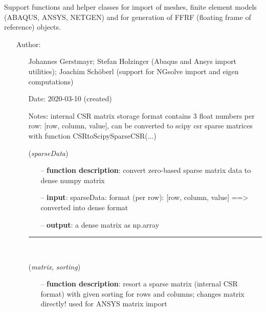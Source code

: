 \begin{itemize}[leftmargin=1.4cm]
\begin{itemize}[leftmargin=0.5cm]
\begin{itemize}[leftmargin=1.4cm]
%
\label{sec:module:FEM}
  Support functions and helper classes for import of meshes, finite element models (ABAQUS, ANSYS, NETGEN) and for generation of FFRF (floating frame of reference) objects.
\begin{itemize}[leftmargin=1.4cm]
\setlength{\itemindent}{-1.4cm}
\item[]Author:
\vspace{-22pt}\begin{itemize}[leftmargin=0.5cm]
\setlength{\itemindent}{-0.5cm}
\item[]   Johannes Gerstmayr; Stefan Holzinger (Abaqus and Ansys import utilities); Joachim Sch\"oberl (support for NGsolve import and eigen computations)
\ei
\item[]Date:      2020-03-10 (created)
\item[]Notes:  	internal CSR matrix storage format contains 3 float numbers per row: [row, column, value], can be converted to scipy csr sparse matrices with function CSRtoScipySparseCSR(...)
\ei
\begin{flushleft}
\label{sec:FEM:CompressedRowSparseToDenseMatrix}
({\it sparseData})
\end{flushleft}
\setlength{\itemindent}{0.7cm}
\begin{itemize}[leftmargin=0.7cm]
  \item[--]  {\bf function description}: convert zero-based sparse matrix data to dense numpy matrix  \item[--]  {\bf input}: sparseData: format (per row): [row, column, value] ==> converted into dense format  \item[--]  {\bf output}: a dense matrix as np.array\vspace{12pt}\end{itemize}
%
\noindent\rule{8cm}{0.75pt}\vspace{1pt} \\ 
\begin{flushleft}
\label{sec:FEM:MapSparseMatrixIndices}
({\it matrix}, {\it sorting})
\end{flushleft}
\setlength{\itemindent}{0.7cm}
\begin{itemize}[leftmargin=0.7cm]
  \item[--]  {\bf function description}: resort a sparse matrix (internal CSR format) with given sorting for rows and columns; changes matrix directly! used for ANSYS matrix import\vspace{12pt}\end{itemize}

\end{itemize}
\end{itemize}
\end{itemize}
\end{itemize}
\end{itemize}
